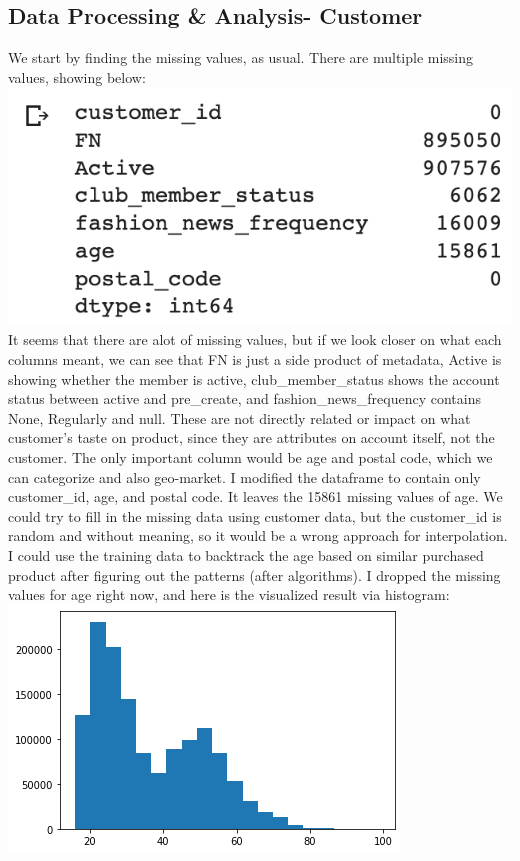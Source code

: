 \documentclass{article}
\begin{document}
\subsection{Data Processing \& Analysis- Customer}
We start by finding the missing values, as usual. There are multiple missing values, showing below:
\\
\includegraphics[]{customerisna}
\\
It seems that there are alot of missing values, but if we look closer on what each columns meant, we can see that FN is just a side product of metadata, Active is showing whether the member is active, club\_member\_status shows the account status between active and pre\_create, and fashion\_news\_frequency contains None, Regularly and null. These are not directly related or impact on what customer's taste on product, since they are attributes on account itself, not the customer. The only important column would be age and postal code, which we can categorize and also geo-market. I modified the dataframe to contain only customer\_id, age, and postal code. It leaves the 15861 missing values of age. We could try to fill in the missing data using customer data, but the customer\_id is random and without meaning, so it would be a wrong approach for interpolation. I could use the training data to backtrack the age based on similar purchased product after figuring out the patterns (after algorithms). I dropped the missing values for age right now, and here is the visualized result via histogram:
\includegraphics[width=\textwidth]{histcust}
\end{document}
